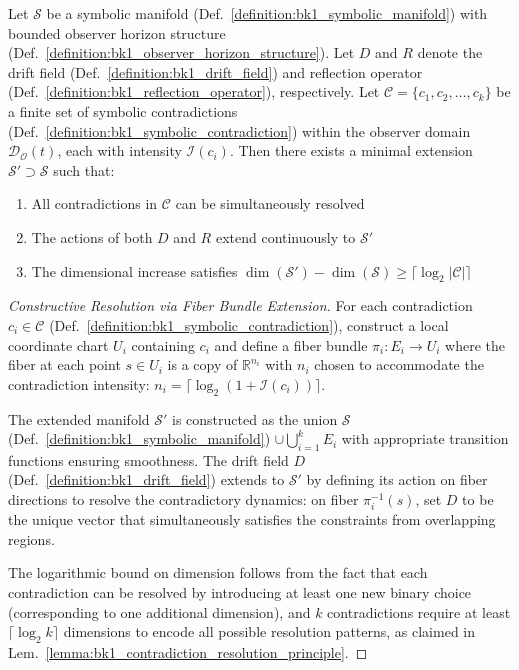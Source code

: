 \begin{lemma}
\label{lemma:bk1_contradiction_resolution_principle}
Let $\mathcal{S}$ be a symbolic manifold (Def.~\ref{definition:bk1_symbolic_manifold}) with bounded observer horizon structure (Def.~\ref{definition:bk1_observer_horizon_structure}). Let $D$ and $R$ denote the drift field (Def.~\ref{definition:bk1_drift_field}) and reflection operator (Def.~\ref{definition:bk1_reflection_operator}), respectively. Let $\mathcal{C} = \{c_1, c_2, \ldots, c_k\}$ be a finite set of symbolic contradictions (Def.~\ref{definition:bk1_symbolic_contradiction}) within the observer domain $\mathcal{D}_\mathcal{O}(t)$, each with intensity $\mathcal{I}(c_i)$. Then there exists a minimal extension $\mathcal{S}' \supset \mathcal{S}$ such that:
\begin{enumerate}
    \item All contradictions in $\mathcal{C}$ can be simultaneously resolved
    \item The actions of both $D$ and $R$ extend continuously to $\mathcal{S}'$
    \item The dimensional increase satisfies $\dim(\mathcal{S}') - \dim(\mathcal{S}) \geq \lceil \log_2 |\mathcal{C}| \rceil$
\end{enumerate}
\end{lemma}

\begin{proof}[Constructive Resolution via Fiber Bundle Extension]
\label{proof:bk1_constructive_resolution}
For each contradiction $c_i \in \mathcal{C}$ (Def.~\ref{definition:bk1_symbolic_contradiction}), construct a local coordinate chart $U_i$ containing $c_i$ and define a fiber bundle $\pi_i: E_i \to U_i$ where the fiber at each point $s \in U_i$ is a copy of $\mathbb{R}^{n_i}$ with $n_i$ chosen to accommodate the contradiction intensity: $n_i = \lceil \log_2(1 + \mathcal{I}(c_i)) \rceil$.

The extended manifold $\mathcal{S}'$ is constructed as the union $\mathcal{S}$ (Def.~\ref{definition:bk1_symbolic_manifold}) $\cup \bigcup_{i=1}^k E_i$ with appropriate transition functions ensuring smoothness. The drift field $D$ (Def.~\ref{definition:bk1_drift_field}) extends to $\mathcal{S}'$ by defining its action on fiber directions to resolve the contradictory dynamics: on fiber $\pi_i^{-1}(s)$, set $D$ to be the unique vector that simultaneously satisfies the constraints from overlapping regions.

The logarithmic bound on dimension follows from the fact that each contradiction can be resolved by introducing at least one new binary choice (corresponding to one additional dimension), and $k$ contradictions require at least $\lceil \log_2 k \rceil$ dimensions to encode all possible resolution patterns, as claimed in Lem.~\ref{lemma:bk1_contradiction_resolution_principle}.
\end{proof}

